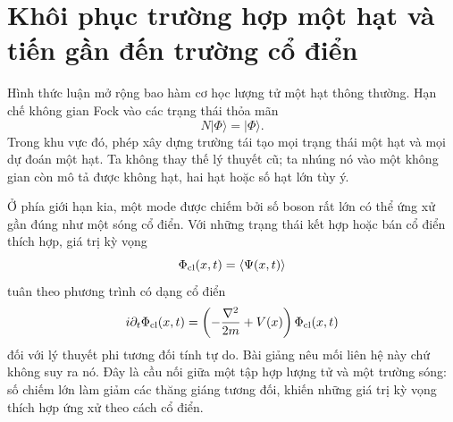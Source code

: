 \begin{classroomqa}
\end{classroomqa}

\begin{classroomqa}
\end{classroomqa}

\begin{classroomqa}
\end{classroomqa}

\section{Khôi phục trường hợp một hạt và tiến gần đến trường cổ điển}

Hình thức luận mở rộng bao hàm cơ học lượng tử một hạt thông thường. Hạn chế không gian Fock vào các trạng thái thỏa mãn
\begin{equation}
N|\Phi\rangle=|\Phi\rangle.
\end{equation}
Trong khu vực đó, phép xây dựng trường tái tạo mọi trạng thái một hạt và mọi dự đoán một hạt. Ta không thay thế lý thuyết cũ; ta nhúng nó vào một không gian còn mô tả được không hạt, hai hạt hoặc số hạt lớn tùy ý.

Ở phía giới hạn kia, một mode được chiếm bởi số boson rất lớn có thể ứng xử gần đúng như một sóng cổ điển. Với những trạng thái kết hợp hoặc bán cổ điển thích hợp, giá trị kỳ vọng
\begin{equation}
\Phi_{\rm cl}(x,t)=\langle\Psi(x,t)\rangle
\end{equation}
tuân theo phương trình có dạng cổ điển
\begin{equation}
i\partial_t\Phi_{\rm cl}(x,t)
=\left(-\frac{\nabla^2}{2m}+V(x)\right)\Phi_{\rm cl}(x,t)
\label{eq:l07-classical-schrodinger}
\end{equation}
đối với lý thuyết phi tương đối tính tự do. Bài giảng nêu mối liên hệ này chứ không suy ra nó. Đây là cầu nối giữa một tập hợp lượng tử và một trường sóng: số chiếm lớn làm giảm các thăng giáng tương đối, khiến những giá trị kỳ vọng thích hợp ứng xử theo cách cổ điển.

